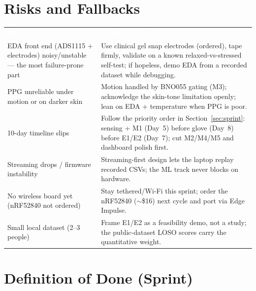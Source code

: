 \documentclass[11pt]{article}
\newcommand{\hd}[1]{\textbf{\sffamily\textcolor{white}{#1}}}
\begin{document}
\section{Risks and Fallbacks}\label{sec:risks}

{
\begin{tabularx}{\linewidth}{@{}p{4.6cm} Y@{}}
 \hd{Risk} & \hd{Fallback / mitigation} \\
EDA front end (ADS1115 + electrodes) noisy/unstable --- the most failure-prone part & Use clinical gel
snap electrodes (ordered), tape firmly, validate on a known relaxed-vs-stressed self-test; if hopeless,
demo EDA from a recorded dataset while debugging. \\
PPG unreliable under motion or on darker skin & Motion handled by BNO055 gating (M3); acknowledge the
skin-tone limitation openly; lean on EDA + temperature when PPG is poor. \\
10-day timeline slips & Follow the priority order in Section~\ref{sec:sprint}: sensing + M1 (Day~5)
before glove (Day~8) before E1/E2 (Day~7); cut M2/M4/M5 and dashboard polish first. \\
Streaming drops / firmware instability & Streaming-first design lets the laptop replay recorded CSVs;
the ML track never blocks on hardware. \\
No wireless board yet (nRF52840 not ordered) & Stay tethered/Wi-Fi this sprint; order the nRF52840
($\sim$\$16) next cycle and port via Edge Impulse. \\
Small local dataset (2--3 people) & Frame E1/E2 as a feasibility demo, not a study; the public-dataset
LOSO scores carry the quantitative weight. \\
\end{tabularx}}

\section{Definition of Done (Sprint)}\label{sec:dod}
\end{document}
